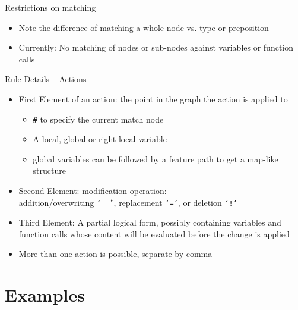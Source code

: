 \documentclass{beamer}
\begin{document}

\begin{frame}{Restrictions on matching}
  \begin{itemize}
  \item Note the difference of matching a whole node vs. type or preposition
  \item Currently: No matching of nodes or sub-nodes against variables or
    function calls
  \end{itemize}
\end{frame}


\begin{frame}{Rule Details -- Actions}
  \begin{itemize}
  \item First Element of an action: the point in the graph the action is
    applied to
    \begin{itemize}
    \item \texttt{\#} to specify the current match node
    \item A local, global or right-local variable
    \item global variables can be followed by a feature path to get a map-like
      structure
    \end{itemize}
  \item Second Element: modification operation:\\
    addition/overwriting \texttt{`\,\^\,'},
    replacement \texttt{`='}, or deletion \texttt{`!'}
  \item Third Element: A partial logical form, possibly containing variables
    and function calls whose content will be evaluated before the change is
    applied
  \item More than one action is possible, separate by comma
  \end{itemize}
\end{frame}


\section{Examples}

\end{document}
